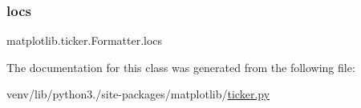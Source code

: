 \subsubsection{\texorpdfstring{locs}{locs}}
{\footnotesize\ttfamily matplotlib.\+ticker.\+Formatter.\+locs\hspace{0.3cm}{\ttfamily [static]}}



The documentation for this class was generated from the following file\+:\begin{DoxyCompactItemize}
\item 
venv/lib/python3./site-\/packages/matplotlib/\hyperlink{ticker_8py}{ticker.\+py}\end{DoxyCompactItemize}
